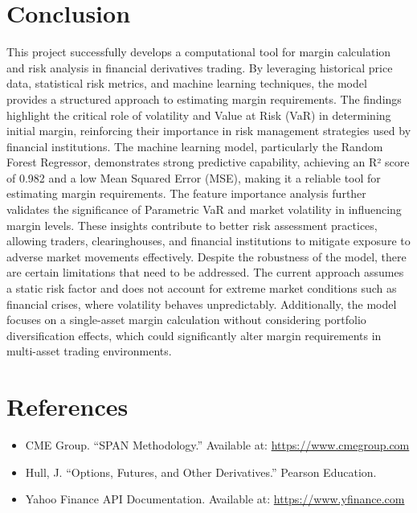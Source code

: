 \documentclass[a4paper,12pt]{article}
\begin{document}
\section{Conclusion}
This project successfully develops a computational tool for margin calculation and risk analysis in financial derivatives trading. By leveraging historical price data, statistical risk metrics, and machine learning techniques, the model provides a structured approach to estimating margin requirements. The findings highlight the critical role of volatility and Value at Risk (VaR) in determining initial margin, reinforcing their importance in risk management strategies used by financial institutions.
\vspace{1em}
The machine learning model, particularly the Random Forest Regressor, demonstrates strong predictive capability, achieving an R² score of 0.982 and a low Mean Squared Error (MSE), making it a reliable tool for estimating margin requirements. The feature importance analysis further validates the significance of Parametric VaR and market volatility in influencing margin levels. These insights contribute to better risk assessment practices, allowing traders, clearinghouses, and financial institutions to mitigate exposure to adverse market movements effectively.
\vspace{1em}
Despite the robustness of the model, there are certain limitations that need to be addressed. The current approach assumes a static risk factor and does not account for extreme market conditions such as financial crises, where volatility behaves unpredictably. Additionally, the model focuses on a single-asset margin calculation without considering portfolio diversification effects, which could significantly alter margin requirements in multi-asset trading environments.


\vspace{3em}

\section{References}
\begin{itemize}
    \item CME Group. ``SPAN Methodology.'' Available at: \url{https://www.cmegroup.com}
    \item Hull, J. ``Options, Futures, and Other Derivatives.'' Pearson Education.
    \item Yahoo Finance API Documentation. Available at: \url{https://www.yfinance.com}
\end{itemize}
\end{document}
